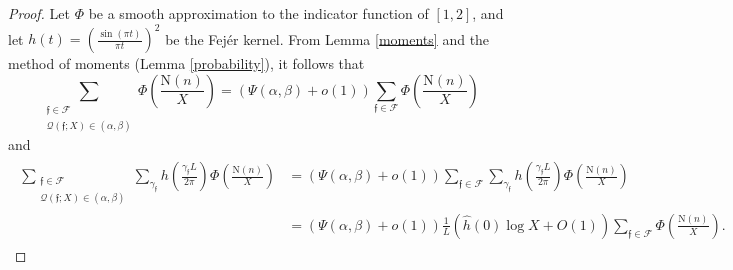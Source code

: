 \documentclass[11pt]{amsart}
\newcommand{\norm}{\mathrm{N}}
\numberwithin{equation}{section}
\theoremstyle{remark}
\begin{document}
\begin{proof}
Let $\Phi$ be a smooth approximation to the indicator function of $[1, 2]$, and let
$
h(t) = ( \frac{\sin(\pi t)}{\pi t} )^2
$ be 
the Fej\'er kernel.
From Lemma \ref{moments} and the method of moments (Lemma \ref{probability}), it follows that
\begin{equation}\label{1st-asym}
 \sum_{\substack{ \mathfrak{f} \in\mathcal{F}\\ \mathcal{Q}(\mathfrak{f};X) \in (\alpha,\beta) }}  \Phi\left(\frac{\norm(n)}{X}\right)
= ( \Psi(\alpha,\beta) +o(1) )  \sum_{\mathfrak{f} \in\mathcal{F}} \Phi\left(\frac{\norm(n)}{X}\right)
\end{equation}
and
\begin{align}\label{2nd-asym}
\begin{split}
 \sum_{\substack{ \mathfrak{f} \in\mathcal{F}\\ \mathcal{Q}(\mathfrak{f};X) \in (\alpha,\beta) }}  \sum_{\gamma_{\mathfrak{f} }}h\left( \frac{\gamma_{\mathfrak{f} } L}{2\pi}\right)\Phi\left(\frac{\norm(n)}{X}\right)
&= ( \Psi(\alpha,\beta) +o(1) )  \sum_{\mathfrak{f} \in\mathcal{F}} \sum_{\gamma_{\mathfrak{f} }}h\left( \frac{\gamma_{\mathfrak{f} } L}{2\pi}\right)\Phi\left(\frac{\norm(n)}{X}\right)\\
&= ( \Psi(\alpha,\beta)   +o(1) )
\frac{1}{L} 
    \left(\hat{h}(0) \log X + O(1)\right)\sum_{\mathfrak{f} \in\mathcal{F}} \Phi\left(\frac{\norm(n)}{X}\right) .
 \end{split}
\end{align}


\end{proof}
\end{document}
